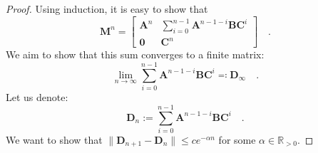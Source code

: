 \documentclass[../../main.tex]{subfiles}
\begin{document}
    \begin{proof}
        Using induction, it is easy to show that
        \[
            \bm{M}^n =
            \begin{bmatrix}
            \bm{A}^n & \sum_{i=0}^{n-1} \bm{A}^{n-1-i} \bm{B} \bm{C}^i \\
            \bm{0} & \bm{C}^n
            \end{bmatrix}
            \quad .
        \]
        We aim to show that this sum converges to a finite matrix:
        \[
        \lim_{n \to \infty} \sum_{i=0}^{n-1} \bm{A}^{n-1-i} \bm{B} \bm{C}^i \eqqcolon \bm{D}_\infty \quad .
        \]
        Let us denote:
        \[
        \bm{D}_n := \sum_{i=0}^{n-1} \bm{A}^{n-1-i} \bm{B} \bm{C}^i \quad .
        \]
        We want to show that $\|\bm{D}_{n+1} - \bm{D}_{n}\| \leq c e^{-\alpha n}$ for some $\alpha \in \mathbb{R}_{> 0}$.


\end{proof}
\end{document}
